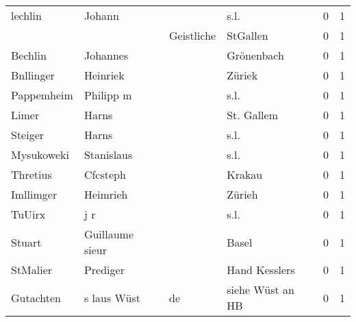 \begin{center}
\begin{tiny}
\begin{longtabu}{llllrr}
                  lechlin &                             Johann &             &                                        s.l. &          0 &         1 \\
                          &                                    &  Geistliche &                                    StGallen &          0 &         1 \\
                  Bechlin &                           Johannes &             &                                  Grönenbach &          0 &         1 \\
                Bnllinger &                           Heinriek &             &                                      Züriek &          0 &         1 \\
               Pappemheim &                          Philipp m &             &                                        s.l. &          0 &         1 \\
                    Limer &                              Harns &             &                                  St. Gallem &          0 &         1 \\
                  Steiger &                              Harns &             &                                        s.l. &          0 &         1 \\
               Mysukoweki &                         Stanislaus &             &                                        s.l. &          0 &         1 \\
                 Thretius &                           Cfcsteph &             &                                      Krakau &          0 &         1 \\
                Imllimger &                           Heimrieh &             &                                      Zürieh &          0 &         1 \\
                   TuUirx &                                j r &             &                                        s.l. &          0 &         1 \\
                   Stuart &                    Guillaume sieur &             &                                       Basel &          0 &         1 \\
                 StMalier &                           Prediger &             &                               Hand Kesslers &          0 &         1 \\
                Gutachten &                        s laus Wüst &          de &                            siehe Wüst an HB &          0 &         1 \\

\end{longtabu}
\end{tiny}
\end{center}
